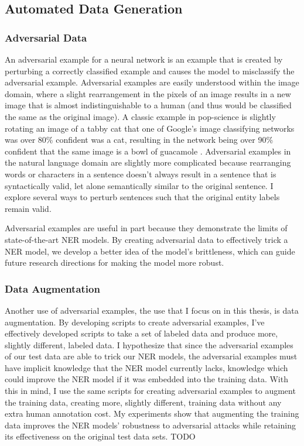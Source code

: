 \subsection{Automated Data Generation}
\subsubsection{Adversarial Data}
An adversarial example for a neural network is an example that is created by perturbing a correctly classified example and causes the model to misclassify the  adversarial example. Adversarial examples are easily understood within the image domain, where a slight rearrangement in the pixels of an image results in a new image that is almost indistinguishable to a human (and thus would be classified the same as the original image). A classic example in pop-science is slightly rotating an image of a tabby cat that one of Google's image classifying networks was over 80\% confident was a cat, resulting in the network being over 90\% confident that the same image is a bowl of guacamole \cite{guacamole}. Adversarial examples in the natural language domain are slightly more complicated because rearranging words or characters in a sentence doesn't always result in a sentence that is syntactically valid, let alone semantically similar to the original sentence. I explore several ways to perturb sentences such that the original entity labels remain valid.

Adversarial examples are useful in part because they demonstrate the limits of state-of-the-art NER models. By creating adversarial data to effectively trick a NER model, we develop a better idea of the model's brittleness, which can guide future research directions for making the model more robust.

\subsubsection{Data Augmentation}
Another use of adversarial examples, the use that I focus on in this thesis, is data augmentation. By developing scripts to create adversarial examples, I've effectively developed scripts to take a set of labeled data and produce more, slightly different, labeled data. I hypothesize that since the adversarial examples of our test data are able to trick our NER models, the adversarial examples must have implicit knowledge that the NER model currently lacks, knowledge which could improve the NER model if it was embedded into the training data. With this in mind, I use the same scripts for creating adversarial examples to augment the training data, creating more, slightly different, training data without any extra human annotation cost. My experiments show that augmenting the training data improves the NER models' robustness to adversarial attacks while retaining its effectiveness on the original test data sets. TODO


